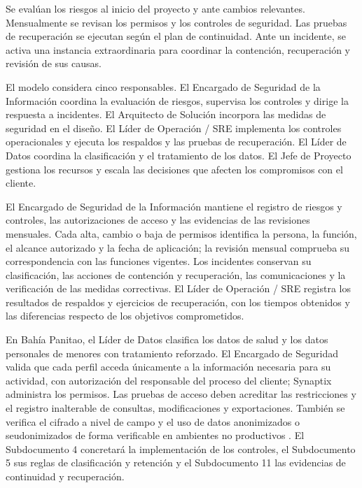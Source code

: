 Se evalúan los riesgos al inicio del proyecto y ante cambios relevantes.
Mensualmente se revisan los permisos y los controles de seguridad.
Las pruebas de recuperación se ejecutan según el plan de continuidad.
Ante un incidente, se activa una instancia extraordinaria para
coordinar la contención, recuperación y revisión de sus causas.

El modelo considera cinco responsables. El Encargado de Seguridad de la Información coordina la evaluación
de riesgos, supervisa los controles y dirige la respuesta a incidentes.
El Arquitecto de Solución incorpora las medidas de seguridad en el
diseño. El Líder de Operación / SRE implementa los controles
operacionales y ejecuta los respaldos y las pruebas de recuperación.
El Líder de Datos coordina la clasificación y el tratamiento de los
datos. El Jefe de Proyecto gestiona los recursos y escala las
decisiones que afecten los compromisos con el cliente.

El Encargado de Seguridad de la Información mantiene el registro de riesgos y controles, las autorizaciones de acceso y las evidencias de las revisiones mensuales. Cada alta, cambio o baja de permisos identifica la persona, la función, el alcance autorizado y la fecha de aplicación; la revisión mensual comprueba su correspondencia con las funciones vigentes. Los incidentes conservan su clasificación, las acciones de contención y recuperación, las comunicaciones y la verificación de las medidas correctivas. El Líder de Operación / SRE registra los resultados de respaldos y ejercicios de recuperación, con los tiempos obtenidos y las diferencias respecto de los objetivos comprometidos.

En Bahía Panitao, el Líder de Datos clasifica los datos de salud y los datos personales de menores con tratamiento reforzado. El Encargado de Seguridad valida que cada perfil acceda únicamente a la información necesaria para su actividad, con autorización del responsable del proceso del cliente; Synaptix administra los permisos. Las pruebas de acceso deben acreditar las restricciones y el registro inalterable de consultas, modificaciones y exportaciones. También se verifica el cifrado a nivel de campo y el uso de datos anonimizados o seudonimizados de forma verificable en ambientes no productivos \parencites[cap.~10, restricción~14; cap.~15, RT-11.10 y RT-16.09]{caso07}[RT-11.25, p.~24; RT-16.07, p.~29; RT-16.30, p.~31]{bases-transversales}. El Subdocumento 4 concretará la implementación de los controles, el Subdocumento 5 sus reglas de clasificación y retención y el Subdocumento 11 las evidencias de continuidad y recuperación.

